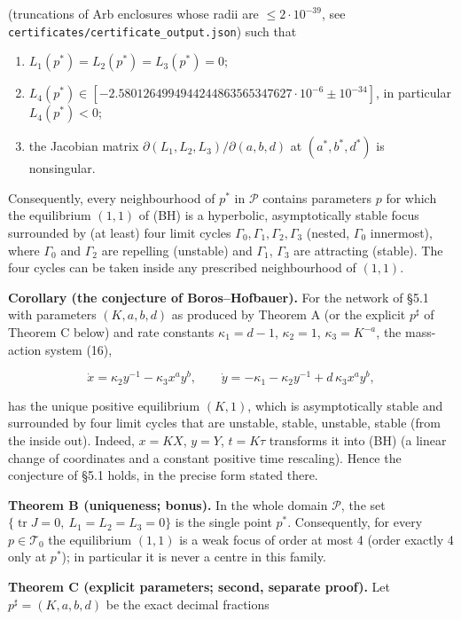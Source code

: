 \documentclass[11pt,a4paper]{report}
\begin{document}
(truncations of Arb enclosures whose radii are \(\le 2\cdot10^{-39}\), see
\texttt{certificates/certificate\_output.json}) such that

\begin{enumerate}
\def\labelenumi{\arabic{enumi}.}
\tightlist
\item
  \(L_1(p^*)=L_2(p^*)=L_3(p^*)=0\);
\item
  \(L_4(p^*)\in[-2.5801264994944244863565347627\cdot 10^{-6}\pm 10^{-34}]\), in particular \(L_4(p^*)<0\);
\item
  the Jacobian matrix \(\partial(L_1,L_2,L_3)/\partial(a,b,d)\) at \((a^*,b^*,d^*)\) is nonsingular.
\end{enumerate}

Consequently, every neighbourhood of \(p^*\) in \(\mathcal P\) contains parameters \(p\) for which the
equilibrium \((1,1)\) of (BH) is a hyperbolic, asymptotically stable focus surrounded by (at least) four limit
cycles \(\Gamma_0,\Gamma_1,\Gamma_2,\Gamma_3\) (nested, \(\Gamma_0\) innermost), where \(\Gamma_0\) and \(\Gamma_2\)
are repelling (unstable) and \(\Gamma_1\), \(\Gamma_3\) are attracting (stable). The four cycles can be taken
inside any prescribed neighbourhood of \((1,1)\).

\textbf{Corollary (the conjecture of Boros--Hofbauer).} For the network of §5.1 with parameters \((K,a,b,d)\) as
produced by Theorem A (or the explicit \(p^\sharp\) of Theorem C below) and rate constants \(\kappa_1=d-1\),
\(\kappa_2=1\), \(\kappa_3=K^{-a}\), the mass-action system (16),

\[\dot x = \kappa_2 y^{-1}-\kappa_3x^ay^b,\qquad \dot y=-\kappa_1-\kappa_2y^{-1}+d\,\kappa_3x^ay^b,\]

has the unique positive equilibrium \((K,1)\), which is asymptotically stable and surrounded by four limit
cycles that are unstable, stable, unstable, stable (from the inside out). Indeed, \(x=KX\), \(y=Y\),
\(t=K\tau\) transforms it into (BH) (a linear change of coordinates and a constant positive time rescaling).
Hence the conjecture of §5.1 holds, in the precise form stated there.

\textbf{Theorem B (uniqueness; bonus).} In the whole domain \(\mathcal P\), the set
\(\{\operatorname{tr}J=0,\ L_1=L_2=L_3=0\}\) is the single point \(p^*\). Consequently, for every
\(p\in\mathcal T_0\) the equilibrium \((1,1)\) is a weak focus of order at most 4 (order exactly 4 only at
\(p^*\)); in particular it is never a centre in this family.

\textbf{Theorem C (explicit parameters; second, separate proof).} Let \(p^\sharp=(K,a,b,d)\) be the exact
decimal fractions
\end{document}
